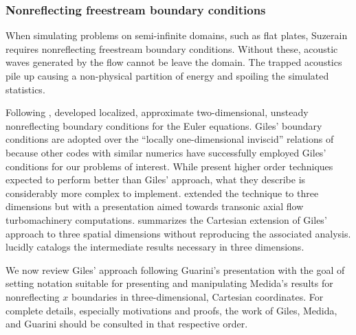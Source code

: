 \documentclass[letterpaper,11pt,nointlimits,reqno,draft]{amsart}
\begin{document}
\subsubsection{Nonreflecting freestream boundary conditions}
\label{sec:nonreflectingbcs}

When simulating problems on semi-infinite domains, such as flat plates,
Suzerain requires nonreflecting freestream boundary conditions.  Without these,
acoustic waves generated by the flow cannot be leave the domain.   The trapped
acoustics pile up causing a non-physical partition of energy and spoiling the
simulated statistics.

Following \citet{Engquist1977Absorbing},
\citet{Giles1988Nonreflecting,Giles1990Nonreflecting} developed localized,
approximate two-dimensional, unsteady nonreflecting boundary conditions for the
Euler equations.  Giles' boundary conditions are adopted over the ``locally
one-dimensional inviscid'' relations of \citet{Poinsot1992Boundary} because
other codes with similar numerics have successfully employed Giles' conditions
for our problems of interest.  While \citet{Rowley2000Discretely} present
higher order techniques expected to perform better than Giles' approach, what
they describe is considerably more complex to implement.
\citet{Saxer1993QuasiThreeDimensional} extended the technique to three
dimensions but with a presentation aimed towards transonic axial flow
turbomachinery computations.  \citet{Guarini1998} summarizes the Cartesian
extension of Giles' approach to three spatial dimensions without reproducing
the associated analysis.  \citet{Medida2007} lucidly catalogs the intermediate
results necessary in three dimensions.

We now review Giles' approach following Guarini's presentation with the goal of
setting notation suitable for presenting and manipulating Medida's results for
nonreflecting $x$ boundaries in three-dimensional, Cartesian coordinates.  For
complete details, especially motivations and proofs, the work of Giles, Medida,
and Guarini should be consulted in that respective order.
\end{document}
